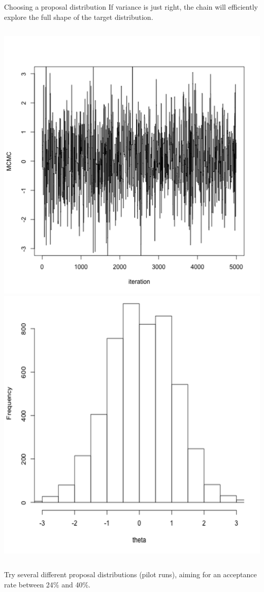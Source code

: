 \documentclass[compress]{beamer}
\begin{document}
\begin{frame}[label=sec-8-5]{Choosing a proposal distribution}
If \alert{variance is just right}, the chain will efficiently explore the full shape of the target distribution.
\begin{columns}[c] 
\includegraphics[width=0.8\linewidth]{Var3}
\includegraphics[width=0.8\linewidth]{Trace3}
\end{columns}  
Try several different proposal distributions (\alert{pilot runs}), aiming for an acceptance rate between 24\%  and 40\%. 
\end{frame}
\end{document}
